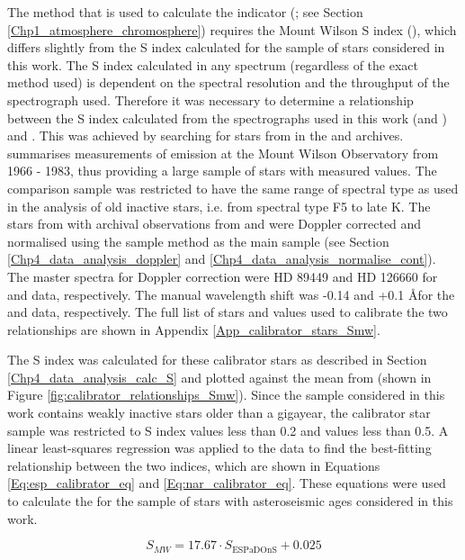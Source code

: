 The method that is used to calculate the \Rprime indicator (\citealt{Noyes_etal_1984}; see Section \ref{Chp1_atmosphere_chromosphere}) requires the Mount Wilson S index (\Smw), which differs slightly from the S index calculated for the sample of stars considered in this work. The S index calculated in any spectrum (regardless of the exact method used) is dependent on the spectral resolution and the throughput of the spectrograph used. Therefore it was necessary to determine a relationship between the S index calculated from the spectrographs used in this work (\esp and \narval) and \Smw. This was achieved by searching for stars from \citet{Duncan_etal_1991} in the \esp and \narval archives. \citet{Duncan_etal_1991} summarises measurements of \caII emission at the Mount Wilson Observatory from 1966 - 1983, thus providing a large sample of stars with measured \Smw values. The comparison sample was restricted to have the same range of spectral type as used in the analysis of old inactive stars, i.e. from spectral type F5 to late K. The stars from \citet{Duncan_etal_1991} with archival observations from \esp and \narval were Doppler corrected and normalised using the sample method as the main sample (see Section \ref{Chp4_data_analysis_doppler} and \ref{Chp4_data_analysis_normalise_cont}). The master spectra for Doppler correction were HD 89449 and HD 126660 for \esp and \narval data, respectively. The manual wavelength shift was -0.14 and +0.1 \AA \space for the \esp and \narval data, respectively. The full list of stars and values used to calibrate the two relationships are shown in Appendix \ref{App_calibrator_stars_Smw}.

The S index was calculated for these calibrator stars as described in Section \ref{Chp4_data_analysis_calc_S} and plotted against the mean \Smw from \citet{Duncan_etal_1991} (shown in Figure \ref{fig:calibrator_relationships_Smw}). Since the sample considered in this work contains weakly inactive stars older than a gigayear, the calibrator star sample was restricted to S index values less than 0.2 and \Smw values less than 0.5. A linear least-squares regression was applied to the data to find the best-fitting relationship between the two indices, which are shown in Equations \ref{Eq:esp_calibrator_eq} and \ref{Eq:nar_calibrator_eq}. These equations were used to calculate the \Smw for the sample of stars with asteroseismic ages considered in this work.

\begin{equation}
S_{MW} = 17.67 \cdot S_{\mathrm{ESPaDOnS}}+ 0.025
\label{Eq:esp_calibrator_eq}
\end{equation}

